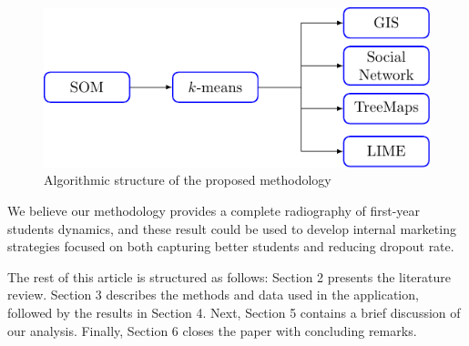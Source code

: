 \documentclass[5p,authoryear,preprint,12pt]{elsarticle}
\begin{document}

\begin{figure}[h]
	\centering
	\includegraphics[trim={0cm 0cm 0cm 0cm},clip, scale=1]{methods}
	\caption{Algorithmic structure of the proposed methodology}
	\label{methods} 
\end{figure}

We believe our methodology provides a complete radiography of first-year students dynamics, and these result could be used to develop internal marketing strategies focused on both capturing better students and reducing dropout rate.

The rest of this article is structured as follows: Section 2 presents the literature review. Section 3 describes the methods and data used in the application, followed by the results in Section 4. Next, Section 5 contains a brief discussion of our analysis. Finally, Section 6 closes the paper with concluding remarks.
\end{document}
